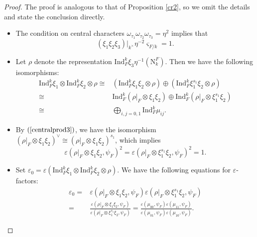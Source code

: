 \documentclass[12pt]{amsart}
\theoremstyle{Theorem}
\theoremstyle{Theorem}
\theoremstyle{Theorem}
\theoremstyle{Theorem}
\theoremstyle{Plain}
\theoremstyle{remark}
\theoremstyle{remark}
\theoremstyle{Definition}
\begin{document}
\begin{proof}
    The proof is analogous to that of Proposition \ref{cr2}, so we omit the details and state the conclusion directly.
    \begin{itemize}
        \item The condition on central characters $ \omega_{ \tau_1 } \omega_{ \tau_2 } \omega_{ \tau_3 } = \eta^2 $ implies that
        \begin{equation}
            \label{centralprod3}
            ( \xi_1 \xi_2 \xi_3 )|_{ k^\times } \eta^{-2} \varsigma_{ F/k } = 1.
        \end{equation}
        \item Let $\rho$ denote the representation $ \mathrm{Ind}^k_F \xi_3 \eta^{-1} \left( \mathrm{N}^F_k \right) $. Then we have the following isomorphisms:
        \[
            \begin{aligned}
                \mathrm{Ind}^k_F \xi_1 \otimes \mathrm{Ind}^k_F \xi_2 \otimes \rho
                \cong& \left( \mathrm{Ind}^k_F \xi_1 \xi_2 \otimes \rho \right) \oplus \left( \mathrm{Ind}^k_F \xi_1^{ s_1 } \xi_2 \otimes \rho \right)          \\
                \cong& \mathrm{Ind}^k_F \left( \rho|_F \otimes \xi_1 \xi_2 \right) \oplus \mathrm{Ind}^k_F \left( \rho|_F \otimes \xi_1^{ s_1 } \xi_2 \right)\\
                \cong& \bigoplus_{ i, j = 0, 1 } \mathrm{Ind}^k_F \mu_{ij}.
            \end{aligned}
        \]
        \item By $ ( \ref{centralprod3} ) $, we have the isomorphism $ ( \rho|_F \otimes \xi_1 \xi_2 )^\vee \cong ( \rho|_F \otimes \xi_1 \xi_2 )^{ s_1 } $, which implies
        \[
            \varepsilon \left( \rho|_F \otimes \xi_1 \xi_2, \psi_F \right)^2 = \varepsilon \left( \rho|_F \otimes \xi_1^{ s_1 } \xi_2, \psi_F \right)^2 = 1.
        \]
        \item Set $ \varepsilon_0 = \varepsilon \left( \mathrm{Ind}^k_F \xi_1 \otimes \mathrm{Ind}^k_F \xi_2 \otimes \rho \right) $. We have the following equations for $\varepsilon$-factors:
        \[
            \begin{aligned}
                \varepsilon_0 =& \varepsilon \left( \rho|_F \otimes \xi_1 \xi_2, \psi_F \right) \varepsilon \left( \rho|_F \otimes \xi_1^{ s_1 } \xi_2, \psi_F \right)\\
                              =& \frac{ \varepsilon \left( \rho|_F \otimes \xi_1 \xi_2, \psi_F \right) }{ \varepsilon \left( \rho|_F \otimes \xi_1^{ s_1 } \xi_2, \psi_F \right) } = \frac{ \varepsilon \left( \mu_{00}, \psi_F \right) \varepsilon \left( \mu_{11}, \psi_F \right) }{ \varepsilon \left( \mu_{01}, \psi_F \right) \varepsilon \left( \mu_{10}, \psi_F \right) }.
            \end{aligned}
        \]
    \end{itemize}


\end{proof}
\end{document}

